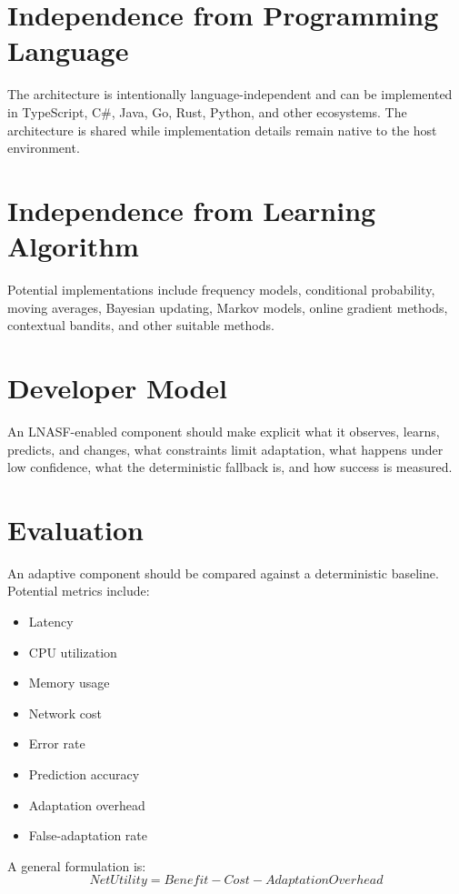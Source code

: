 \documentclass[11pt,a4paper]{article}
\begin{document}
\section{Independence from Programming Language}
The architecture is intentionally language-independent and can be implemented in TypeScript, C\#, Java, Go, Rust, Python, and other ecosystems. The architecture is shared while implementation details remain native to the host environment.

\section{Independence from Learning Algorithm}
Potential implementations include frequency models, conditional probability, moving averages, Bayesian updating, Markov models, online gradient methods, contextual bandits, and other suitable methods.

\section{Developer Model}
An LNASF-enabled component should make explicit what it observes, learns, predicts, and changes, what constraints limit adaptation, what happens under low confidence, what the deterministic fallback is, and how success is measured.

\section{Evaluation}
An adaptive component should be compared against a deterministic baseline. Potential metrics include:
\begin{itemize}
\item Latency
\item CPU utilization
\item Memory usage
\item Network cost
\item Error rate
\item Prediction accuracy
\item Adaptation overhead
\item False-adaptation rate
\end{itemize}

A general formulation is:
\[
NetUtility=Benefit-Cost-AdaptationOverhead
\]
\end{document}
